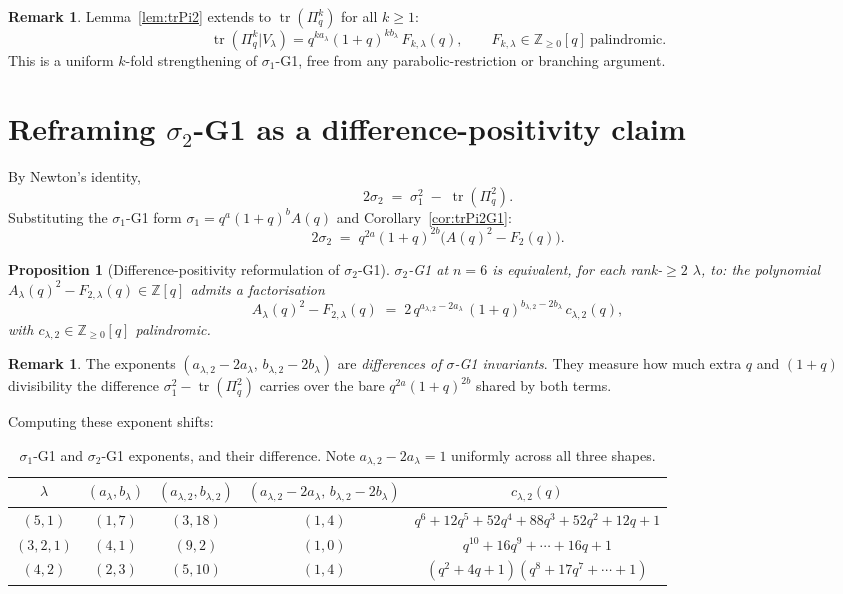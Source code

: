 \documentclass{article}
\newtheorem{proposition}[theorem]{Proposition}
\theoremstyle{definition}
\newtheorem{remark}[theorem]{Remark}
\begin{document}
\begin{remark}
Lemma~\ref{lem:trPi2} extends to $\operatorname{tr}(\Pi_q^k)$ for all $k\geq 1$:
\[
  \operatorname{tr}(\Pi_q^k|V_\lambda) = q^{k a_\lambda}(1+q)^{k b_\lambda}\,F_{k,\lambda}(q),
  \qquad F_{k,\lambda}\in\mathbb{Z}_{\geq 0}[q]\ \text{palindromic.}
\]
This is a uniform $k$-fold strengthening of $\sigma_1$-G1, free from any
parabolic-restriction or branching argument.
\end{remark}

\section{Reframing $\sigma_2$-G1 as a difference-positivity claim}

By Newton's identity,
\begin{equation}\label{eq:newton2}
  2\sigma_2 \;=\; \sigma_1^2 \;-\; \operatorname{tr}(\Pi_q^2).
\end{equation}
Substituting the $\sigma_1$-G1 form $\sigma_1 = q^{a}(1+q)^{b}A(q)$ and
Corollary~\ref{cor:trPi2G1}:
\[
  2\sigma_2 \;=\; q^{2a}(1+q)^{2b}\bigl(A(q)^2 - F_2(q)\bigr).
\]

\begin{proposition}[Difference-positivity reformulation of $\sigma_2$-G1]\label{prop:reform}
$\sigma_2$-G1 at $n=6$ is equivalent, for each rank-$\geq 2$ $\lambda$, to: the
polynomial $A_\lambda(q)^2 - F_{2,\lambda}(q) \in \mathbb{Z}[q]$ admits a
factorisation
\[
  A_\lambda(q)^2 - F_{2,\lambda}(q)
  \;=\;
  2\, q^{a_{\lambda,2}-2a_\lambda}\,(1+q)^{b_{\lambda,2}-2b_\lambda}\,c_{\lambda,2}(q),
\]
with $c_{\lambda,2} \in \mathbb{Z}_{\geq 0}[q]$ palindromic.
\end{proposition}

\begin{remark}
The exponents $(a_{\lambda,2}-2a_\lambda,\, b_{\lambda,2}-2b_\lambda)$ are
\emph{differences of $\sigma$-G1 invariants}. They measure how much extra
$q$ and $(1+q)$ divisibility the difference $\sigma_1^2-\operatorname{tr}(\Pi_q^2)$
carries over the bare $q^{2a}(1+q)^{2b}$ shared by both terms.
\end{remark}

Computing these exponent shifts:

\begin{table}[h]
\centering
\begin{tabular}{c|c|c|c|c}
$\lambda$ & $(a_\lambda, b_\lambda)$ & $(a_{\lambda,2}, b_{\lambda,2})$ & $(a_{\lambda,2}-2a_\lambda,\,b_{\lambda,2}-2b_\lambda)$ & $c_{\lambda,2}(q)$ \\
\hline
$(5,1)$ & $(1,7)$ & $(3,18)$ & $(1,4)$ & $q^6+12q^5+52q^4+88q^3+52q^2+12q+1$ \\
$(3,2,1)$ & $(4,1)$ & $(9,2)$ & $(1,0)$ & $q^{10}+16q^9+\cdots+16q+1$ \\
$(4,2)$ & $(2,3)$ & $(5,10)$ & $(1,4)$ & $(q^2+4q+1)(q^8+17q^7+\cdots+1)$ \\
\end{tabular}
\caption{$\sigma_1$-G1 and $\sigma_2$-G1 exponents, and their difference. Note
$a_{\lambda,2}-2a_\lambda = 1$ uniformly across all three shapes.}
\end{table}
\end{document}
